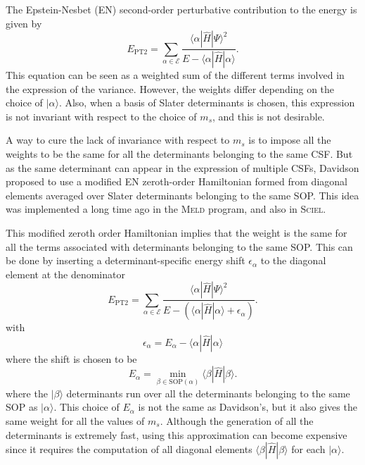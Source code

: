 \documentclass[aip,jcp,reprint,showkeys]{revtex4-1}
\newcommand{\ket}[1]{|#1\rangle}
\newcommand{\sop}{SOP}
\newcommand{\csf}{CSF}
\newcommand{\mel}[3]{\langle #1 | #2 | #3 \rangle}
\newcommand{\ept}{E_\text{PT2}}
\begin{document}
The Epstein-Nesbet (EN) second-order perturbative contribution to the energy is given
by
\begin{equation}
\ept = \sum_{\alpha \in \mathcal{E}} \frac{\mel{\alpha}{\hat{H}}{\Psi}^2}{E-\mel{\alpha}{\hat{H}}{\alpha}}.
\label{eq:pt2}
\end{equation}
This equation can be seen as a weighted sum of the different terms involved in
the expression of the variance. However, the weights differ depending on the
choice of $\ket{\alpha}$. Also, when a basis of Slater determinants is chosen,
this expression is not invariant with respect to the choice of $m_s$, and this 
is not desirable.

A way to cure the lack of invariance with respect to $m_s$ is to impose all the weights
to be the same for all the determinants belonging to the same {\csf}. But as 
the same determinant can appear in the expression of multiple {\csf s}, Davidson
proposed to use a modified EN zeroth-order Hamiltonian formed from
diagonal elements averaged over Slater determinants belonging to the same
{\sop}. This idea was implemented a long time ago in the \textsc{Meld} 
program,\cite{Davidson_1979,Kozlowski_1994} and also in \textsc{Sciel}.\cite{Sciel}

This modified zeroth order Hamiltonian implies that the weight is the same for
all the terms associated with determinants belonging to the same {\sop}. This can be done by
inserting a determinant-specific energy shift $\epsilon_\alpha$ to the
diagonal element at the denominator 
\begin{equation}
\ept = \sum_{\alpha \in \mathcal{E}} \frac{\mel{\alpha}{\hat{H}}{\Psi}^2}{E-\left(\mel{\alpha}{\hat{H}}{\alpha}+\epsilon_\alpha \right)}.
\end{equation}
with
\begin{equation}
\epsilon_\alpha = E_\alpha - \mel{\alpha}{\hat{H}}{\alpha} 
\end{equation}
where the shift is chosen to be
\begin{equation}
E_\alpha = \min_{\beta \in \text{\sop}(\alpha)} \mel{\beta}{\hat{H}}{\beta}.
\end{equation}
where the $\ket{\beta}$ determinants run over all the determinants belonging to the
same {\sop} as $\ket{\alpha}$.
This choice of $E_\alpha$ is not the same as Davidson's, but it also
gives the same weight for all the values of $m_s$.
Although the generation of all the determinants is extremely fast, using
this approximation can become expensive since it requires the computation of
all diagonal elements $\mel{\beta}{\hat{H}}{\beta}$ for each
$\ket{\alpha}$.
\end{document}
